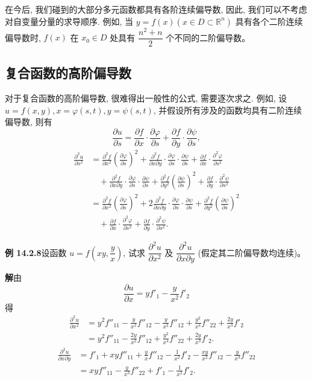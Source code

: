\documentclass[UTF8, 12pt, fontset=fandol, oneside]{ctexart}
\begin{document}
在今后, 我们碰到的大部分多元函数都具有各阶连续偏导数, 因此, 我们可以不考虑对自变量分量的求导顺序. 例如, 当 $y=f(x)(x\in D\subset\mathbb R^n)$ 具有各个二阶连续偏导数时, $f(x)$ 在 $x_0\in D$ 处具有 $\dfrac{n^2+n}{2}$ 个不同的二阶偏导数。

\subsection{复合函数的高阶偏导数}

对于复合函数的高阶偏导数, 很难得出一般性的公式, 需要逐次求之. 例如, 设 $u=f(x,y),x=\varphi(s,t),y=\psi(s,t)$, 并假设所有涉及的函数均具有二阶连续偏导数, 则有
\[
  \frac{\partial u}{\partial s}
  =\frac{\partial f}{\partial x}\cdot\frac{\partial\varphi}{\partial s}
  +\frac{\partial f}{\partial y}\cdot\frac{\partial\psi}{\partial s},
\]
\[
\begin{aligned}
  \frac{\partial^2u}{\partial s^2}
  &=\frac{\partial^2 f}{\partial x^2}\left(\frac{\partial\varphi}{\partial s}\right)^2
  +\frac{\partial^2 f}{\partial x\partial y}\cdot
  \frac{\partial\varphi}{\partial s}\cdot\frac{\partial\psi}{\partial s}
  +\frac{\partial f}{\partial x}\cdot\frac{\partial^2\varphi}{\partial s^2}\\
  &\quad+\frac{\partial^2 f}{\partial x\partial y}\cdot
  \frac{\partial\varphi}{\partial s}\cdot\frac{\partial\psi}{\partial s}
  +\frac{\partial^2 f}{\partial y^2}\left(\frac{\partial\psi}{\partial s}\right)^2
  +\frac{\partial f}{\partial y}\cdot\frac{\partial^2\psi}{\partial s^2}\\
  &=\frac{\partial^2 f}{\partial x^2}\left(\frac{\partial\varphi}{\partial s}\right)^2
  +2\frac{\partial^2 f}{\partial x\partial y}\cdot
  \frac{\partial\varphi}{\partial s}\cdot\frac{\partial\psi}{\partial s}
  +\frac{\partial^2 f}{\partial y^2}\left(\frac{\partial\psi}{\partial s}\right)^2\\
  &\quad+\frac{\partial f}{\partial x}\cdot\frac{\partial^2\varphi}{\partial s^2}
  +\frac{\partial f}{\partial y}\cdot\frac{\partial^2\psi}{\partial s^2}.
\end{aligned}
\]

\noindent\textbf{例 14.2.8}\quad 设函数 $u=f\left(xy,\dfrac yx\right)$, 试求 $\dfrac{\partial^2u}{\partial x^2}$ 及 $\dfrac{\partial^2u}{\partial x\partial y}$ (假定其二阶偏导数均连续)。

\noindent\textbf{解}\quad 由
\[
  \frac{\partial u}{\partial x}=yf'_1-\frac y{x^2}f'_2
\]
得
\[
\begin{aligned}
  \frac{\partial^2u}{\partial x^2}
  &=y^2f''_{11}-\frac y{x^2}f''_{12}
  -\frac y{x^2}f''_{12}+\frac{y^2}{x^4}f''_{22}
  +\frac{2y}{x^3}f'_2\\
  &=y^2f''_{11}-\frac{2y}{x^2}f''_{12}
  +\frac{y^2}{x^4}f''_{22}+\frac{2y}{x^3}f'_2.
\end{aligned}
\]
\[
\begin{aligned}
  \frac{\partial^2u}{\partial x\partial y}
  &=f'_1+xyf''_{11}+\frac yx f''_{12}
  -\frac1{x^2}f'_2-\frac{xy}{x^2}f''_{12}
  -\frac y{x^3}f''_{22}\\
  &=xyf''_{11}-\frac y{x^3}f''_{22}+f'_1-\frac1{x^2}f'_2.
\end{aligned}
\]
\end{document}
